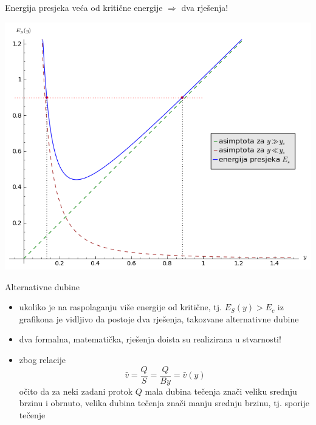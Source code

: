 \documentclass{beamer}
\begin{document}
\begin{frame}{Energija presjeka veća od kritične energije $\Rightarrow$ dva rješenja!}

\begin{center}
\includegraphics[height=0.7\paperheight]{slike/MF-10-mirni-i-siloviti-tok}
\par\end{center}

\end{frame}

\begin{frame}{Alternativne dubine}

\begin{itemize}
\item ukoliko je na raspolaganju više energije od kritične, tj. $E_{S}(y)>E_{c}$
iz grafikona je vidljivo da postoje dva rješenja, takozvane \alert{alternativne dubine}
\item dva formalna, matematička, rješenja doista su realizirana u stvarnosti!
\item zbog relacije 
\[
\bar{v}=\frac{Q}{S}=\frac{Q}{By}=\bar{v}(y)
\]
očito da za neki zadani protok $Q$ mala dubina tečenja znači veliku
srednju brzinu i obrnuto, velika dubina tečenja znači manju srednju
brzinu, tj. sporije tečenje
\end{itemize}
\end{frame}
\end{document}
